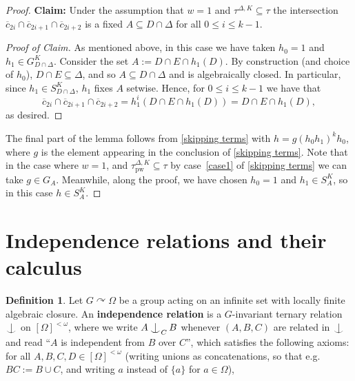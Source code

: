 \documentclass{article}
\theoremstyle{remark}
\theoremstyle{definition}
\newtheorem{definition}[theorem]{Definition}
\def\acts{\curvearrowright}
\newcommand{\pw}[0]{\tau_{\mathrm{pw}}}
\def\Ind#1#2{#1\setbox0=\hbox{$#1x$}\kern\wd0\hbox to 0pt{\hss$#1\mid$\hss}
	\lower.9\ht0\hbox to 0pt{\hss$#1\smile$\hss}\kern\wd0}
\def\ind{\mathop{\mathpalette\Ind{}}}
\newcommand*{\greysquare}{\textcolor{gray}{\blacksquare}}
\newenvironment{subproof}[1][\proofname]{%
\renewcommand{\qedsymbol}{$\greysquare$}%
\begin{proof}[#1]%
	}{%
\end{proof}%
}
\renewcommand\leq{\leqslant}
\begin{document}
{{{{{\begin{proof}
    \textbf{Claim:} Under the assumption that $w=1$ and $\tau^{\Delta,{K}}\subseteq\tau$ the intersection $\overline{c}_{2{i}}\cap \overline{c}_{2i+1}\cap \overline{c}_{2i+2}$ is a fixed $A\subseteq D\cap\Delta$ for all $0\leq i\leq k-1$.
      \begin{subproof}[Proof of Claim]
      	{As mentioned above, in this case we have taken $h_0=1$ and $h_1\in G^K_{D\cap\Delta}$. Consider the set $A:=D\cap E\cap h_{1}(D)$. By construction (and choice of $h_0$), $D\cap E\subseteq\Delta$, and so $A\subseteq D\cap\Delta$ and is algebraically closed. In particular, since $h_1\in S^K_{D\cap\Delta}$, $h_1$ fixes $A$ setwise. Hence, for $0\leq i\leq k-1$ we have that}
      	\begin{equation*}
      		\overline{c}_{2i}\cap \overline{c}_{2i+1}\cap \overline{c}_{2i+2}=h_{1}^{i}(D\cap E\cap h_{1}(D))=D\cap E\cap h_{1}(D),
      	\end{equation*}
        {as desired.}
      \end{subproof}
       The 
       {final part of the lemma} follows from \cref{skipping terms} {with $h = g(h_0 h_1)^k h_0$, where $g$ is the element appearing in the conclusion of \cref{skipping terms}}. Note that in the case {where} $w=1$, {and} $\pw^{\Delta,K}\subseteq\tau$ by case~\ref{case1} of 
       \cref{skipping terms} 
       we can {take $g\in G_A$.}
       {Meanwhile, along the proof, %
       we have chosen $h_{0}=1$ and} $h_{1}\in S_{A}^{K}$, so in this case $h\in S_{A}^{K}$.
   \end{proof}

\section{Independence relations and their calculus}\label{sec: calcindependence}


















    
    \begin{definition}    	\label{d:indipendence basic} Let $G\acts\Omega$ be a group acting on an infinite 
        set with 
        locally finite algebraic closure.  An \textbf{independence relation} is a $G$-invariant ternary relation $\ind$ on  $[\Omega]^{<\omega}$, where we write $A\ind_{C}B$ whenever $(A,B,C)$ are related in $\ind$ and read ``$A$ is independent from $B$ over $C$'', which  satisfies the following axioms:  for all  $A,B,C,D\in[\Omega]^{<\omega}$ (writing unions as concatenations, so that e.g.~$BC:=B\cup C$, and writing $a$ instead of $\{a\}$ for $a\in\Omega$), 


\end{definition}}}}}}
\end{document}
